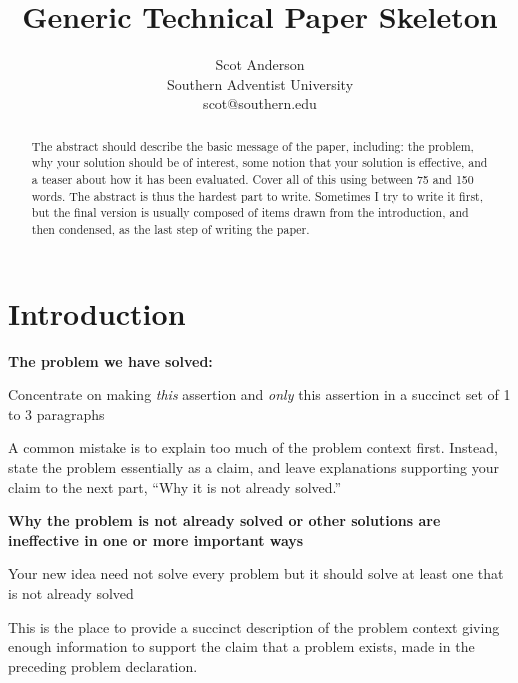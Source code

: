 \documentclass[pdf,bookmarks,colorlinks=true]{IEEEtran}
\title{\bf Generic Technical Paper Skeleton}
\author{Scot Anderson\\
Southern Adventist University\\
scot@southern.edu
}
\begin{document}
\maketitle

\begin{abstract}

The abstract should describe the basic message of the paper, including: the 
problem, why your solution should be of interest, some notion that your
solution is effective, and a teaser about how it has been evaluated. Cover all \cite{Decan}
of this using between 75 and 150 words. The abstract is thus the hardest part
to write. Sometimes I try to write it first, but the final version is usually
composed of items drawn from the introduction, and then condensed, as the last
step of writing the paper.

\end{abstract}



\section{Introduction}
\label{sec:Introduction}

\textbf{The problem we have solved:}

Concentrate on making {\em this} assertion and {\em only} this assertion in a
succinct set of 1 to 3 paragraphs

A common mistake is to explain too much of the problem context first. Instead,
state the problem essentially as a claim, and leave explanations supporting
your claim to the next part, ``Why it is not already solved.''



\textbf{Why the problem is not already solved or other solutions
are ineffective in one or more important ways}

Your new idea need not solve every problem but it should solve at least one
that is not already solved

This is the place to provide a succinct description of the problem context
giving enough information to support the claim that a problem exists, made in
the preceding problem declaration.
\end{document}
